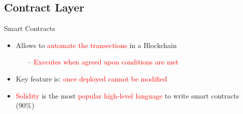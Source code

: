 \documentclass[aspectratio=169]{beamer}
\begin{document}
\subsection{Contract Layer}
\begin{frame}{Smart Contracts}

 \begin{itemize}

\item Allows to \textcolor{red}{automate the transections} in a Blockchain
\begin{itemize}
\item[--] \textcolor{red}{Executes when agreed upon conditions are met}
\end{itemize}
\item Key feature is: \textcolor{red}{once deployed cannot be modified}
\item \textcolor{red}{Solidity} is the most \textcolor{red}{popular high-level language} to write smart contracts (90\%)
\end{itemize}
\end{frame}
\end{document}
